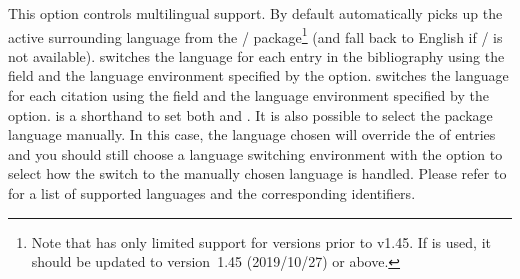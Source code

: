 \begin{optionlist}


This option controls multilingual support. By default \biblatex automatically picks up the active surrounding language from the / package\footnote{Note that \biblatex has only limited support for  versions prior to v1.45. If  is used, it should be updated to version~1.45 (2019/10/27) or above.} (and fall back to English if / is not available).  switches the language for each entry in the bibliography using the  field and the language environment specified by the  option.  switches the language for each citation using the  field and the language environment specified by the  option.  is a shorthand to set both  and . It is also possible to select the package language manually. In this case, the language chosen will override the  of entries and you should still choose a language switching environment with the  option to select how the switch to the manually chosen language is handled. Please refer to  for a list of supported languages and the corresponding identifiers.


\end{optionlist}
